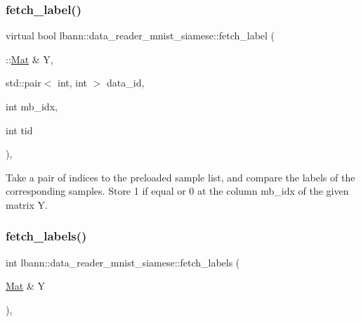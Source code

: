 \mbox{\label{classlbann_1_1data__reader__mnist__siamese_addb5a1f18e903d73a2c32125c90f4a1f}} 
\subsubsection{\texorpdfstring{fetch\+\_\+label()}{fetch\_label()}\hspace{0.1cm}{\footnotesize\ttfamily [2/2]}}
{\footnotesize\ttfamily virtual bool lbann\+::data\+\_\+reader\+\_\+mnist\+\_\+siamese\+::fetch\+\_\+label (\begin{DoxyParamCaption}\item[{\+::\hyperlink{base_8hpp_a68f11fdc31b62516cb310831bbe54d73}{Mat} \&}]{Y,  }\item[{std\+::pair$<$ int, int $>$}]{data\+\_\+id,  }\item[{int}]{mb\+\_\+idx,  }\item[{int}]{tid }\end{DoxyParamCaption})\hspace{0.3cm}{\ttfamily [protected]}, {\ttfamily [virtual]}}

Take a pair of indices to the preloaded sample list, and compare the labels of the corresponding samples. Store 1 if equal or 0 at the column mb\+\_\+idx of the given matrix Y. \mbox{\label{classlbann_1_1data__reader__mnist__siamese_a1709140fcdcea9baaaf1bab7a48f3bce}} 
\subsubsection{\texorpdfstring{fetch\+\_\+labels()}{fetch\_labels()}}
{\footnotesize\ttfamily int lbann\+::data\+\_\+reader\+\_\+mnist\+\_\+siamese\+::fetch\+\_\+labels (\begin{DoxyParamCaption}\item[{\hyperlink{base_8hpp_a68f11fdc31b62516cb310831bbe54d73}{Mat} \&}]{Y }\end{DoxyParamCaption})\hspace{0.3cm}{\ttfamily [override]}, {\ttfamily [virtual]}}



